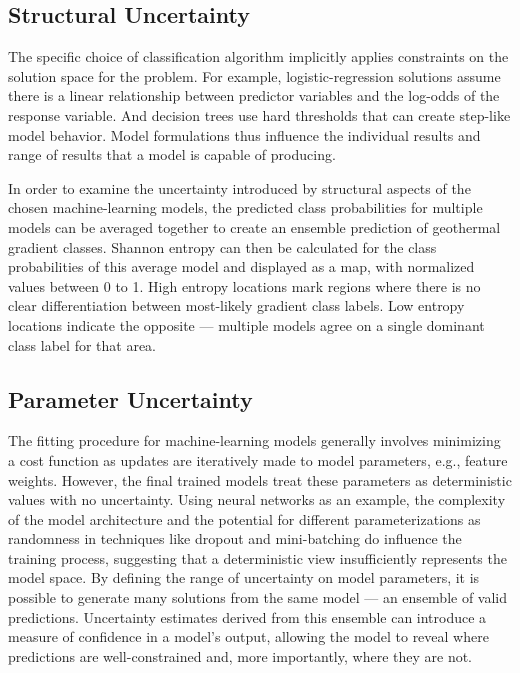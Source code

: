 \subsection{Structural Uncertainty}\label{ch3:structural_uncertainty}

The specific choice of classification algorithm implicitly applies constraints on the solution space for the problem. For example, logistic-regression solutions assume there is a linear relationship between predictor variables and the log-odds of the response variable. And decision trees use hard thresholds that can create step-like model behavior. Model formulations thus influence the individual results and range of results that a model is capable of producing.

In order to examine the uncertainty introduced by structural aspects of the chosen machine-learning models, the predicted class probabilities for multiple models can be averaged together to create an ensemble prediction of geothermal gradient classes. Shannon entropy can then be calculated for the class probabilities of this average model and displayed as a map, with normalized values between 0 to 1. High entropy locations mark regions where there is no clear differentiation between most-likely gradient class labels. Low entropy locations indicate the opposite --- multiple models agree on a single dominant class label for that area.

\subsection{Parameter Uncertainty}\label{ch3:param_uncertainty}

The fitting procedure for machine-learning models generally involves minimizing a cost function as updates are iteratively made to model parameters, e.g., feature weights. However, the final trained models treat these parameters as deterministic values with no uncertainty. Using neural networks as an example, the complexity of the model architecture and the potential for different parameterizations as randomness in techniques like dropout and mini-batching do influence the training process, suggesting that a deterministic view insufficiently represents the model space. By defining the range of uncertainty on model parameters, it is possible to generate many solutions from the same model --- an ensemble of valid predictions. Uncertainty estimates derived from this ensemble can introduce a measure of confidence in a model’s output, allowing the model to reveal where predictions are well-constrained and, more importantly, where they are not.

